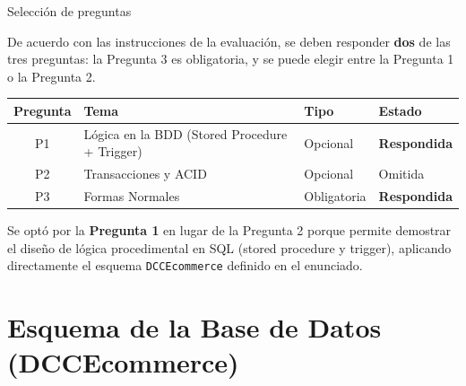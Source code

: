\documentclass[12pt,a4paper]{article}
\begin{document}
\begin{querybox}{Selección de preguntas}

De acuerdo con las instrucciones de la evaluación, se deben responder
\textbf{dos} de las tres preguntas: la Pregunta 3 es obligatoria, y se
puede elegir entre la Pregunta 1 o la Pregunta 2.

\vspace{0.3cm}
\begin{center}
\begin{tabular}{clll}
  \toprule
  \textbf{Pregunta} & \textbf{Tema} & \textbf{Tipo} & \textbf{Estado} \\
  \midrule
  P1 & Lógica en la BDD (Stored Procedure + Trigger) & Opcional & \textbf{\color{OliveGreen}Respondida} \\
  P2 & Transacciones y ACID                          & Opcional & Omitida \\
  P3 & Formas Normales                               & Obligatoria & \textbf{\color{OliveGreen}Respondida} \\
  \bottomrule
\end{tabular}
\end{center}

\vspace{0.3cm}
Se optó por la \textbf{Pregunta 1} en lugar de la Pregunta 2 porque permite
demostrar el diseño de lógica procedimental en SQL (stored procedure y trigger),
aplicando directamente el esquema \texttt{DCCEcommerce} definido en el enunciado.

\end{querybox}

\vspace{0.8cm}

\section*{Esquema de la Base de Datos (DCCEcommerce)}
\end{document}
